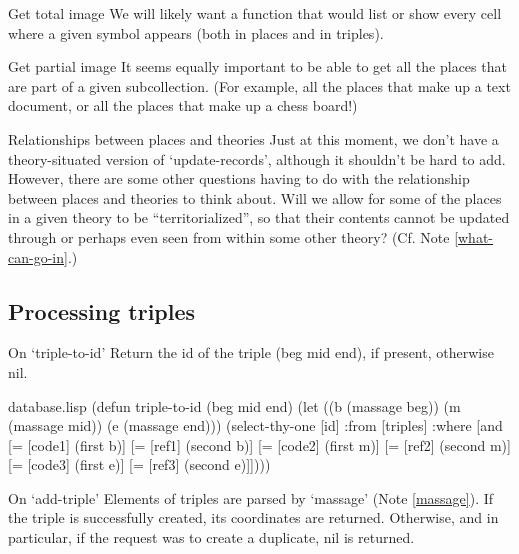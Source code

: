 \begin{notate}{Get total image}
We will likely want a function that would list or show
every cell where a given symbol appears (both in places
and in triples).
\end{notate}

\begin{notate}{Get partial image} \label{partial-image}
It seems equally important to be able to get all the
places that are part of a given subcollection.
(For example, all the places that make up a text
document, or all the places that make up a chess
board!)
\end{notate}

\begin{notate}{Relationships between places and theories}
Just at this moment, we don't have a theory-situated
version of `update-records', although it shouldn't be hard
to add.  However, there are some other questions having to
do with the relationship between places and theories to
think about.  Will we allow for some of the places in a
given theory to be ``territorialized'', so that their
contents cannot be updated through or perhaps even seen
from within some other theory?  (Cf. Note
\ref{what-can-go-in}.)
\end{notate}

\subsection*{Processing triples}

\begin{notate}{On `triple-to-id'}
Return the id of the triple (beg mid end),
if present, otherwise nil.
\end{notate}

\begin{common}{database.lisp}
(defun triple-to-id (beg mid end)
  (let ((b (massage beg))
        (m (massage mid))
        (e (massage end)))
    (select-thy-one [id]
                    :from [triples]
                    :where [and [= [code1] (first b)]
                                [= [ref1] (second b)]
                                [= [code2] (first m)]
                                [= [ref2] (second m)]
                                [= [code3] (first e)]
                                [= [ref3] (second e)]])))
\end{common}

\begin{notate}{On `add-triple'} \label{add-triple}
Elements of triples are parsed by `massage'
(Note \ref{massage}).  If the triple
is successfully created, its coordinates are returned.
Otherwise, and in particular, if the request was to create
a duplicate, nil is returned.
\end{notate}

